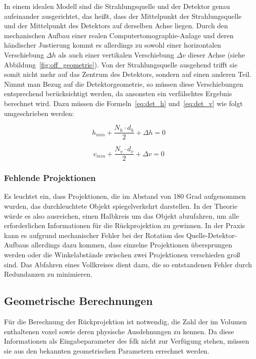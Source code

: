 In einem idealen Modell sind die Strahlungsquelle und der Detektor genau aufeinander ausgerichtet, das heißt, dass der
Mittelpunkt der Strahlungsquelle und der Mittelpunkt des Detektors auf derselben Achse liegen. Durch den mechanischen
Aufbau einer realen Computertomographie-Anlage und deren händischer Justierung kommt es allerdings zu sowohl
einer horizontalen Verschiebung $\Delta h$ als auch einer vertikalen Verschiebung $\Delta v$ dieser Achse (siehe
Abbildung~\ref{fig:off_geometrie}). Von der Strahlungsquelle ausgehend trifft sie somit nicht mehr auf das Zentrum des
Detektors, sondern auf einen anderen Teil. Nimmt man Bezug auf die Detektorgeometrie, so müssen diese Verschiebungen
entsprechend berücksichtigt werden, da ansonsten ein verfälschtes Ergebnis berechnet wird. Dazu müssen die
Formeln~\ref{eq:det_h} und~\ref{eq:det_v} wie folgt umgeschrieben werden:

\begin{equation} 
    h_{min} + \frac{N_h \cdot d_h}{2} + \Delta h = 0
\end{equation}

\begin{equation}
    v_{min} + \frac{N_v \cdot d_v}{2}  + \Delta v = 0
\end{equation}

\subsubsection{Fehlende Projektionen}

Es leuchtet ein, dass Projektionen, die im Abstand von 180 Grad aufgenommen wurden, das durchleuchtete Objekt
spiegelverkehrt darstellen. In der Theorie würde es also ausreichen, einen Halbkreis um das Objekt abzufahren, um alle
erforderlichen Informationen für die Rückprojektion zu gewinnen. In der Praxis kann es aufgrund mechanischer Fehler bei
der Rotation des Quelle-Detektor-Aufbaus allerdings dazu kommen, dass einzelne Projektionen übersprungen werden oder die
Winkelabstände zwischen zwei Projektionen verschieden groß sind. Das Abfahren eines Vollkreises dient dazu, die so
entstandenen Fehler durch Redundanzen zu minimieren.

\subsection{Geometrische Berechnungen}\label{ssec:geometrie}

Für die Berechnung der Rückprojektion ist notwendig, die Zahl der im Volumen enthaltenen \gls{voxel} sowie deren
physische Ausdehnungen zu kennen. Da diese Informationen als Eingabeparameter des \gls{fdk} nicht zur Verfügung stehen,
müssen sie aus den bekannten geometrischen Parametern errechnet werden.

